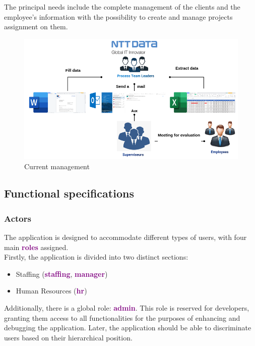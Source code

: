 \documentclass[12pt,a4paper,table,english]{article}
\begin{document}
	The principal needs include the complete management of the clients and the employee's information with the possibility to create and manage projects assignment on them.
	
	\begin{figure}[h!]
		\centering
		\includegraphics[width=0.65\linewidth]{Image/current_app.png}
		\caption{Current management}
		\label{fig:Current management}
	\end{figure}


	\subsection{Functional specifications}
	\subsubsection{Actors}
	The application is designed to accommodate different types of users, with four main \textcolor{purple}{\textbf{roles}} assigned.\\
	Firstly, the application is divided into two distinct sections:\\
	
	\begin{itemize}
		\item Staffing (\textcolor{purple}{\textbf{staffing}}, \textcolor{purple}{\textbf{manager}})
		\item Human Resources (\textcolor{purple}{\textbf{hr}})
	\end{itemize}

	\noindent Additionally, there is a global role: \textcolor{purple}{\textbf{admin}}. This role is reserved for developers, granting them access to all functionalities for the purposes of enhancing and debugging the application.
	Later, the application should be able to discriminate users based on their hierarchical position.
	\pagebreak
	
\end{document}
